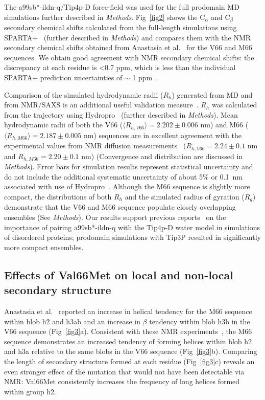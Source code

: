 \documentclass[10pt,letterpaper]{article}
\begin{document}
The a99sb*-ildn-q/Tip4p-D force-field was used for the full prodomain MD simulations further described in {\it Methods}. Fig~\ref{fig2} shows the C$_{\alpha}$ and C$_{\beta}$ secondary chemical shifts calculated from the full-length simulations using SPARTA+~\cite{Shen2010} (further described in {\it Methods}) and compares them with the NMR secondary chemical shifts obtained from Anastasia et al.~\cite{Anastasia2013} for the V66 and M66 sequences. We obtain good agreement with NMR secondary chemical shifts: the discrepancy at each residue is \textless 0.7 ppm, which is less than the individual SPARTA+ prediction uncertainties of $\sim$ 1 ppm~\cite{Shen2010}. 

Comparison of the simulated hydrodynamic radii ($R_h$) generated from MD and from NMR/SAXS is an additional useful validation measure~\cite{Mercadante2015, Rauscher2015, Meng2018}. $R_h$ was calculated from the trajectory using Hydropro~\cite{Ortega2011} (further described in {\it Methods}). Mean hydrodynamic radii of both the V66 ($\langle R_{h, V66}\rangle=2.202\pm{0.006}$ nm) and M66 ($\langle R_{h, M66}\rangle=2.187\pm{0.005}$ nm) sequences are in excellent agreement with the experimental values from NMR diffusion measurements~\cite{Anastasia2013} ($R_{h, V66}=2.24\pm{0.1}$ nm and $R_{h, M66}=2.20\pm{0.1}$ nm) (Convergence and distribution are discussed in {\it Methods}). Error bars for simulation results represent statistical uncertainty and do not include the additional systematic uncertainty of about 5\% or 0.1~nm associated with use of Hydropro~\cite{Ortega2011}. Although the M66 sequence is slightly more compact, the distributions of both $R_h$ and the simulated radius of gyration ($R_g$) demonstrate that the V66 and M66 sequence populate closely overlapping ensembles (See {\it Methods}). Our results support previous reports~\cite{Piana2015, Robustelli2018} on the importance of pairing a99sb*-ildn-q with the Tip4p-D water model in simulations of disordered proteins; prodomain simulations with Tip3P resulted in significantly more compact ensembles.

\subsection*{Effects of Val66Met on local and non-local secondary structure}

Anastasia et al.~\cite{Anastasia2013} reported an increase in helical tendency for the M66 sequence within blob h2 and h3ab and an increase in $\beta$ tendency within blob h3b in the V66 sequence (Fig~\ref{fig3}a). Consistent with these NMR experiments~\cite{Anastasia2013}, the M66 sequence demonstrates an increased tendency of forming helices within blob h2 and h3a relative to the same blobs in the V66 sequence (Fig~\ref{fig3}b). Comparing the length of secondary structure formed at each residue (Fig~\ref{fig3}c) reveals an even stronger effect of the mutation that would not have been detectable via NMR: Val66Met consistently increases the frequency of long helices formed within group h2. 
\end{document}
